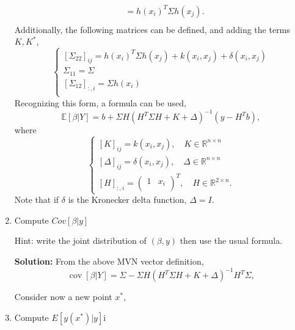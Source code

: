 \documentclass{article}[12pt]
\begin{document}
\begin{enumerate}
\begin{equation}
\begin{aligned}
											 &= h(x_i)^T \Sigma h(x_j). \\
		\end{aligned}
	\end{equation}
	Additionally, the following matrices can be defined, and adding the terms $K, K^*$,
	\begin{equation}
		\begin{cases}
			\left[ \Sigma_{22} \right]_{ij} = h(x_i)^T \Sigma h(x_j) + k(x_i, x_j) + \delta(x_i, x_j) \\
			\Sigma_{11} = \Sigma \\
			\left[ \Sigma_{12} \right]_{:, i} = \Sigma h(x_i)  \\  
		\end{cases}
	\end{equation}
Recognizing this form, a formula can be used,	
\begin{equation}
	\mathbb E \left[ \beta | Y \right] = b + \Sigma H \left( H^T \Sigma H + K + \Delta   \right)^{-1} \left( y - H^T b \right),
\end{equation}
where 
\begin{equation}
	\begin{cases}
		\left[ K \right]_{ij} = k(x_i, x_j), \quad K \in \mathbb R^{n \times n} \\
		\left[ \Delta \right]_{ij} = \delta(x_i, x_j), \quad \Delta \in \mathbb R^{n \times n}\\
		\left[ H \right]_{:, i} = \begin{pmatrix}
			1 & x_i \\
		\end{pmatrix}^T, \quad H \in \mathbb R^{2 \times n}.
	\end{cases}
\end{equation}
Note that if $\delta$ is the Kronecker delta function, $\Delta = I$.

\item Compute $Cov[\beta|y]$

Hint: write the joint distribution of $(\beta,y)$ then use the usual formula.

\textbf{Solution: }From the above MVN vector definition,
\begin{equation}
	\operatorname{cov} \left[ \beta | Y \right] = \Sigma - \Sigma H  \left( H^T \Sigma H + K + \Delta \right)^{-1} H^T \Sigma,
\end{equation}

Consider now a new point $x^*$,
\item Compute $E[y(x^*)|y]$i
	

\end{enumerate}
\end{document}
